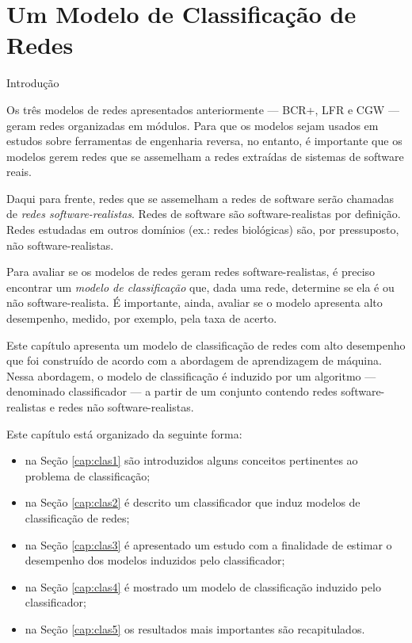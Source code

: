 \chapter{Um Modelo de Classificação de Redes} \label{cap:classificacao}


\begin{section}{Introdução}
	
	Os três modelos de redes apresentados anteriormente --- BCR+, LFR e CGW --- geram redes organizadas em módulos. Para que os modelos sejam usados em estudos sobre ferramentas de engenharia reversa, no entanto, é importante que os modelos gerem redes que se assemelham a redes extraídas de sistemas de software reais.
	
	Daqui para frente, redes que se assemelham a redes de software serão chamadas de \emph{redes software-realistas}. Redes de software são software-realistas por definição. Redes estudadas em outros domínios (ex.: redes biológicas) são, por pressuposto, não software-realistas.
	
	Para avaliar se os modelos de redes geram redes software-realistas, é preciso encontrar um \emph{modelo de classificação} que, dada uma rede, determine se ela é ou não software-realista. É importante, ainda, avaliar se o modelo apresenta alto desempenho, medido, por exemplo, pela taxa de acerto.
	
	Este capítulo apresenta um modelo de classificação de redes com alto desempenho que foi construído de acordo com a abordagem de aprendizagem de máquina. Nessa abordagem, o modelo de classificação é induzido por um algoritmo --- denominado classificador --- a partir de um conjunto contendo redes software-realistas e redes não software-realistas.
	
	Este capítulo está organizado da seguinte forma:
	
	\begin{itemize}
		\item na Seção \ref{cap:clas1} são introduzidos alguns conceitos pertinentes ao problema de classificação;
		\item na Seção \ref{cap:clas2} é descrito um classificador que induz modelos de classificação de redes;
		\item na Seção \ref{cap:clas3} é apresentado um estudo com a finalidade de estimar o desempenho dos modelos induzidos pelo classificador;
		\item na Seção \ref{cap:clas4} é mostrado um modelo de classificação induzido pelo classificador;
		\item na Seção \ref{cap:clas5} os resultados mais importantes são recapitulados.
	\end{itemize}	
	
\end{section}

